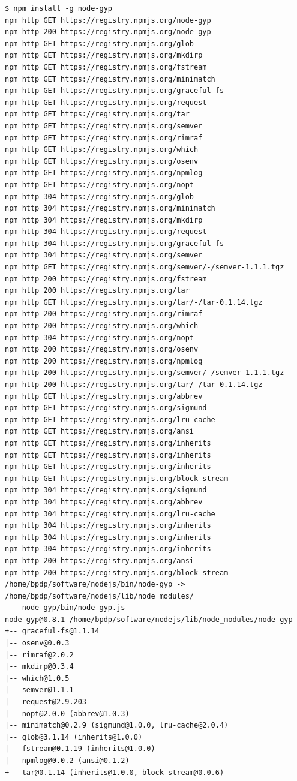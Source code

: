 \lstset{language=bash,caption=Instalasi node-gyp}
\begin{lstlisting}
$ npm install -g node-gyp
npm http GET https://registry.npmjs.org/node-gyp
npm http 200 https://registry.npmjs.org/node-gyp
npm http GET https://registry.npmjs.org/glob
npm http GET https://registry.npmjs.org/mkdirp
npm http GET https://registry.npmjs.org/fstream
npm http GET https://registry.npmjs.org/minimatch
npm http GET https://registry.npmjs.org/graceful-fs
npm http GET https://registry.npmjs.org/request
npm http GET https://registry.npmjs.org/tar
npm http GET https://registry.npmjs.org/semver
npm http GET https://registry.npmjs.org/rimraf
npm http GET https://registry.npmjs.org/which
npm http GET https://registry.npmjs.org/osenv
npm http GET https://registry.npmjs.org/npmlog
npm http GET https://registry.npmjs.org/nopt
npm http 304 https://registry.npmjs.org/glob
npm http 304 https://registry.npmjs.org/minimatch
npm http 304 https://registry.npmjs.org/mkdirp
npm http 304 https://registry.npmjs.org/request
npm http 304 https://registry.npmjs.org/graceful-fs
npm http 304 https://registry.npmjs.org/semver
npm http GET https://registry.npmjs.org/semver/-/semver-1.1.1.tgz
npm http 200 https://registry.npmjs.org/fstream
npm http 200 https://registry.npmjs.org/tar
npm http GET https://registry.npmjs.org/tar/-/tar-0.1.14.tgz
npm http 200 https://registry.npmjs.org/rimraf
npm http 200 https://registry.npmjs.org/which
npm http 304 https://registry.npmjs.org/nopt
npm http 200 https://registry.npmjs.org/osenv
npm http 200 https://registry.npmjs.org/npmlog
npm http 200 https://registry.npmjs.org/semver/-/semver-1.1.1.tgz
npm http 200 https://registry.npmjs.org/tar/-/tar-0.1.14.tgz
npm http GET https://registry.npmjs.org/abbrev
npm http GET https://registry.npmjs.org/sigmund
npm http GET https://registry.npmjs.org/lru-cache
npm http GET https://registry.npmjs.org/ansi
npm http GET https://registry.npmjs.org/inherits
npm http GET https://registry.npmjs.org/inherits
npm http GET https://registry.npmjs.org/inherits
npm http GET https://registry.npmjs.org/block-stream
npm http 304 https://registry.npmjs.org/sigmund
npm http 304 https://registry.npmjs.org/abbrev
npm http 304 https://registry.npmjs.org/lru-cache
npm http 304 https://registry.npmjs.org/inherits
npm http 304 https://registry.npmjs.org/inherits
npm http 304 https://registry.npmjs.org/inherits
npm http 200 https://registry.npmjs.org/ansi
npm http 200 https://registry.npmjs.org/block-stream
/home/bpdp/software/nodejs/bin/node-gyp -> /home/bpdp/software/nodejs/lib/node_modules/
	node-gyp/bin/node-gyp.js
node-gyp@0.8.1 /home/bpdp/software/nodejs/lib/node_modules/node-gyp
+-- graceful-fs@1.1.14
|-- osenv@0.0.3
|-- rimraf@2.0.2
|-- mkdirp@0.3.4
|-- which@1.0.5
|-- semver@1.1.1
|-- request@2.9.203
|-- nopt@2.0.0 (abbrev@1.0.3)
|-- minimatch@0.2.9 (sigmund@1.0.0, lru-cache@2.0.4)
|-- glob@3.1.14 (inherits@1.0.0)
|-- fstream@0.1.19 (inherits@1.0.0)
|-- npmlog@0.0.2 (ansi@0.1.2)
+-- tar@0.1.14 (inherits@1.0.0, block-stream@0.0.6)
\end{lstlisting}

